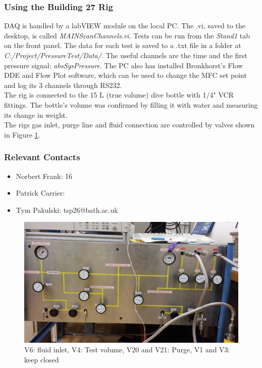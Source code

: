 \documentclass{report}
\begin{document}
\subsubsection{Using the Building 27 Rig}
DAQ is handled by a labVIEW module on the local PC. The .vi, saved to the desktop, is called \textit{MAIN\textunderscore ScanChannels.vi}. Tests can be run from the \textit{Stand1} tab on the front panel. The data for each test is saved to a .txt file in a folder at \textit{C:/Project/PressureTest/Data/}. The useful channels are the time and the first pressure signal: \textit{absSysPressure}. The PC also has installed Bronkhorst's Flow DDE and Flow Plot software, which can be used to change the MFC set point and log its 3 channels through RS232. \\
The rig is connected to the 15 L (true volume) dive bottle with 1/4" VCR fittings. The bottle's volume was confirmed by filling it with water and measuring its change in weight. \\
The rigs gas inlet, purge line and fluid connection are controlled by valves shown in Figure \ref{valves}.
\subsubsection{Relevant Contacts}
\begin{itemize}
	\item{Norbert Frank: 16 }
	\item{Patrick Carrier: }
	\item{Tym Pakulski: tsp26@bath.ac.uk}
\end{itemize}


\begin{figure}[h] \label{valves}
\includegraphics[width=\textwidth]{valves}
\caption{V6: fluid inlet, V4: Test volume, V20 and V21: Purge, V1 and V3: keep closed}
\end{figure}
\end{document}

